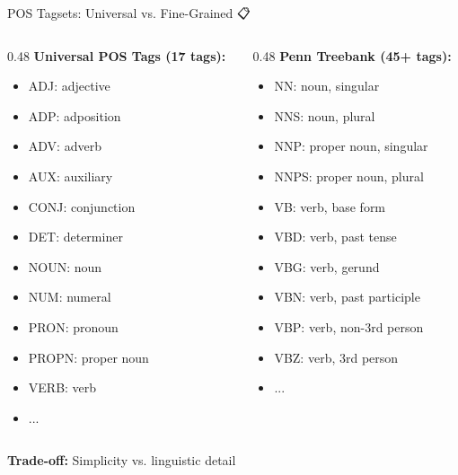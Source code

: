\documentclass[aspectratio=169]{beamer}
\begin{document}
\begin{frame}[shrink=10]{POS Tagsets: Universal vs. Fine-Grained 📋}
    \begin{columns}[T]
        \begin{column}{0.48\textwidth}
            \textbf{Universal POS Tags (17 tags):}
            \begin{itemize}\setlength{\itemsep}{0pt}
                \item ADJ: adjective
                \item ADP: adposition
                \item ADV: adverb
                \item AUX: auxiliary
                \item CONJ: conjunction
                \item DET: determiner
                \item NOUN: noun
                \item NUM: numeral
                \item PRON: pronoun
                \item PROPN: proper noun
                \item VERB: verb
                \item ...
            \end{itemize}
        \end{column}
        \begin{column}{0.48\textwidth}
            \textbf{Penn Treebank (45+ tags):}
            \begin{itemize}\setlength{\itemsep}{0pt}
                \item NN: noun, singular
                \item NNS: noun, plural
                \item NNP: proper noun, singular
                \item NNPS: proper noun, plural
                \item VB: verb, base form
                \item VBD: verb, past tense
                \item VBG: verb, gerund
                \item VBN: verb, past participle
                \item VBP: verb, non-3rd person
                \item VBZ: verb, 3rd person
                \item ...
            \end{itemize}
        \end{column}
    \end{columns}

    \vspace{0.5em}
    \textbf{Trade-off:} Simplicity vs. linguistic detail
\end{frame}
\end{document}
